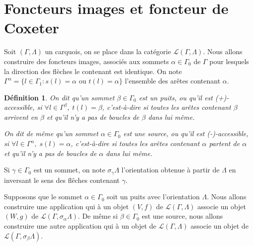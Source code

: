 \documentclass[a4paper,10pt]{article}
\newtheorem{defi}{Définition}[section]
\begin{document}
\clearpage
\section{Foncteurs images et foncteur de Coxeter}
Soit $(\Gamma,\Lambda)$ un carquois, on se place dans la catégorie $\mathscr{L}(\Gamma,\Lambda)$. Nous allons construire des foncteurs images, associés aux sommets $\alpha \in \Gamma_{0}$ de $\Gamma$ pour lesquels la direction des flèches le contenant est identique. On note $\Gamma^{\alpha}=\{ l\in \Gamma_{1} : s(l)=\alpha\text{ ou }t(l)=\alpha\}$ l'ensemble des arêtes contenant $\alpha$.

\begin{defi}
	On dit qu'un sommet $\beta \in \Gamma_{0}$ est un puits, ou qu'il est (+)-accessible, si $\forall l \in \Gamma^{\beta},\; t(l)=\beta$, c'est-à-dire si toutes les arêtes contenant $\beta$ arrivent en $\beta$ et qu'il n'y a pas de boucles de $\beta$ dans lui même.

On dit de même qu'un sommet $\alpha \in \Gamma_{0}$ est une source, ou qu'il est (-)-accessible, si $\forall l \in \Gamma^{\alpha},\; s(l)=\alpha$, c'est-à-dire si toutes les arêtes contenant $\alpha$ partent de $\alpha$ et qu'il n'y a pas de boucles de $\alpha$ dans lui même.
\end{defi}


Si $\gamma \in \Gamma_0$ est un sommet, on note $\sigma_{\gamma}\Lambda$ l'orientation obtenue à partir de $\Lambda$ en inversant le sens des flêches contenant $\gamma$.

Supposons que le sommet $\alpha \in \Gamma_{0}$ soit un puits avec l'orientation $\Lambda$.  Nous allons construire une application qui à un objet $(V,f)$ de $\mathscr{L}(\Gamma,\Lambda)$ associe un objet $(W,g)$ de $\mathscr{L}(\Gamma,\sigma_{\alpha}\Lambda)$. De même si $\beta \in \Gamma_0$ est une source, nous allons construire une autre application qui à un objet de $\mathscr L(\Gamma,\Lambda)$ associe un objet de $\mathscr L(\Gamma,\sigma_{\beta}\Lambda)$. 
\end{document}
